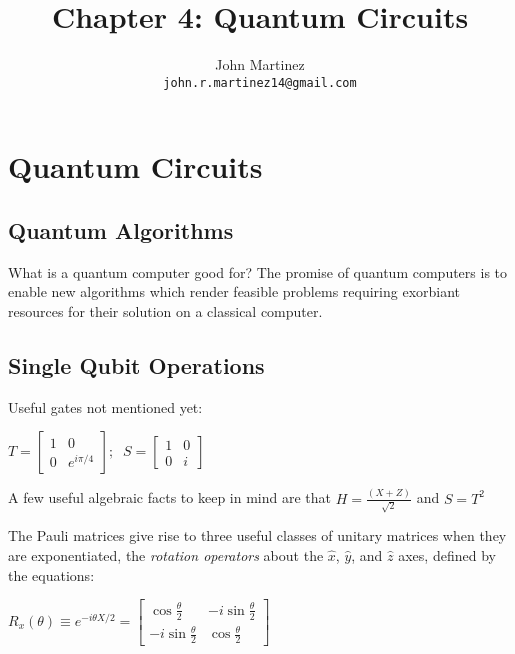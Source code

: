 \documentclass{article}
\title{Chapter 4: Quantum Circuits}
\author{
  John Martinez \\
  \texttt{john.r.martinez14@gmail.com} \\
}
\begin{document}
\maketitle

\section{Quantum Circuits}

\subsection{Quantum Algorithms}
What is a quantum computer good for? The promise of quantum computers is to
enable new algorithms which render feasible problems requiring exorbiant
resources for their solution on a classical computer.

\subsection{Single Qubit Operations}
Useful gates not mentioned yet:

  \begin{center}
    $
      T = \begin{bmatrix}
        1 & 0 \\
        0 & e^{i\pi / 4}
      \end{bmatrix};\mspace{10mu}
      S = \begin{bmatrix}
        1 & 0 \\
        0 & i
      \end{bmatrix}
    $
  \end{center}

A few useful algebraic facts to keep in mind are that
$H = \frac{(X + Z)}{\sqrt{2}}$ and $S = T^{2}$

The Pauli matrices give rise to three useful classes of unitary matrices when
they are exponentiated, the \emph{rotation operators} about the $\hat{x}$,
$\hat{y}$, and $\hat{z}$ axes, defined by the equations:

  \begin{center}
    $R_{x}(\theta) \equiv e^{-i\theta X / 2} = 
    \begin{bmatrix}
      \cos{\frac{\theta}{2}} & -i\sin{\frac{\theta}{2}} \\
      -i\sin{\frac{\theta}{2}} & \cos{\frac{\theta}{2}}
    \end{bmatrix}
    $
  \end{center}
\end{document}
